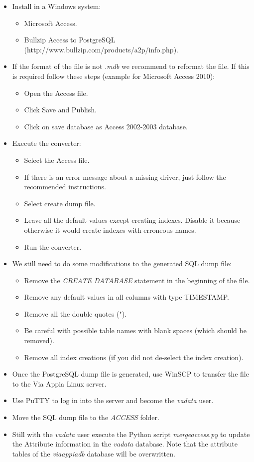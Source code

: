 \documentclass[a4paper,11pt]{article}
\begin{document}
\begin{itemize}
\item Install in a Windows system:
\begin{itemize}
\item Microsoft Access.
\item Bullzip Access to PostgreSQL (http://www.bullzip.com/products/a2p/info.php).
\end{itemize}
\item If the format of the file is not \textit{.mdb} we recommend to reformat the file. If this is required follow these steps (example for Microsoft Access 2010):
\begin{itemize}
\item Open the Access file.
\item Click Save and Publish.
\item Click on save database as Access 2002-2003 database.
\end{itemize}
\item Execute the converter:
\begin{itemize}
\item Select the Access file.
\item If there is an error message about a missing driver, just follow the recommended instructions.
\item Select create dump file.
\item Leave all the default values except creating indexes. Disable it because otherwise it would create indexes with erroneous names.
\item Run the converter.
\end{itemize}
\item We still need to do some modifications to the generated SQL dump file:
\begin{itemize}
\item Remove the \textit{CREATE DATABASE} statement in the beginning of the file.
\item Remove any default values in all columns with type TIMESTAMP.
\item Remove all the double quotes (").
\item Be careful with possible table names with blank spaces (which should be removed).
\item Remove all index creations (if you did not de-select the index creation). 
\end{itemize}

\item Once the PostgreSQL dump file is generated, use WinSCP to transfer the file to the Via Appia Linux server.
\item Use PuTTY to log in into the server and become the \textit{vadata} user.
\item Move the SQL dump file to the \textit{ACCESS} folder.
\item Still with the \textit{vadata} user execute the Python script \textit{mergeaccess.py} to update the Attribute information in the \textit{vadata} database. Note that the attribute tables of the \textit{viaappiadb} database will be overwritten.
\end{itemize}
\end{document}
